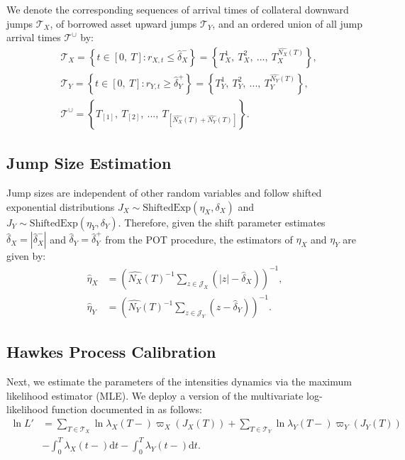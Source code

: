 \documentclass{article}
\newcommand{\diff}{\mathrm{d}}
\theoremstyle{definition}
\begin{document}
We denote the corresponding sequences of arrival times of collateral downward jumps $\mathcal{T}_X$, of borrowed asset upward jumps $\mathcal{T}_Y$, and an ordered union of all jump arrival times $\mathcal{T}^{\cup}$ by:
\begin{equation}
   \begin{split}
& \mathcal{T}_X = \left\{t \in [0,\ T]: r_{X,t} \leq \widehat\delta_X^- \right\} = \left\{T_X^1,\ T_X^2,\ ...,\ T_X^{\widehat{N_X}(T)}\right\},\\
& \mathcal{T}_Y = \left\{t \in [0,\ T]: r_{Y,t} \geq \widehat\delta_Y^+ \right\} = \left\{T_Y^1,\ T_Y^2,\ ...,\ T_Y^{\widehat{N_Y}(T)}\right\},\\
& \mathcal{T}^{\cup} = \left\{T_{[1]},\ T_{[2]},\ ...,\ T_{[\widehat{N_X}(T)+\widehat{N_Y}(T)]}\right\}.
   \end{split}
\end{equation}

\subsection{Jump Size Estimation}

Jump sizes are independent of other random variables and follow shifted exponential distributions $J_X \sim \text{ShiftedExp}(\eta_X, \delta_X)$ and $J_Y \sim \text{ShiftedExp}(\eta_Y, \delta_Y)$. 
Therefore, given the shift parameter estimates $\widehat \delta_X = |\widehat \delta_X^-|$ and $\widehat \delta_Y = \widehat \delta_Y^+$ from the POT procedure, the estimators of $\eta_X$ and $\eta_Y$ are given by:
\begin{equation}\label{eq:mean_p_jumps_sizes}
   \begin{split}
\widehat \eta_X &= \left(\widehat{N_X}(T)^{-1} \sum_{z \in \mathcal{J}_X}\left(|z| - \widehat \delta_X\right)\right)^{-1},\\
\widehat \eta_Y &= \left(\widehat{N_Y}(T)^{-1} \sum_{z \in \mathcal{J}_Y}\left(z - \widehat \delta_Y\right)\right)^{-1}. 
   \end{split}
\end{equation}

\subsection{Hawkes Process Calibration}

Next, we estimate the parameters of the intensities dynamics via the maximum likelihood estimator (MLE). We deploy a version of the multivariate log-likelihood function documented in \cite{embrechts2011multivariate} as follows:
\begin{align}
 \ln L' &= \sum_{T \in \mathcal{T}_X} \ln \lambda_X(T-)\varpi_X(J_X(T))
         + \sum_{T \in \mathcal{T}_Y} \ln \lambda_Y(T-)\varpi_Y(J_Y(T)) \nonumber\\
 &- \int_0^T \lambda_X(t-)\diff t 
 - \int_0^T \lambda_Y(t-)\diff t.
\end{align}
\end{document}
